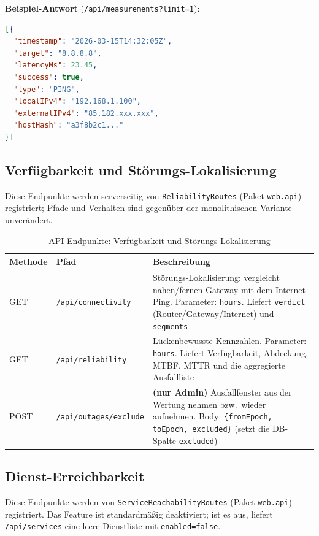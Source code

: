 \textbf{Beispiel-Antwort} (\texttt{/api/measurements?limit=1}):
\begin{lstlisting}[language=json]
[{
  "timestamp": "2026-03-15T14:32:05Z",
  "target": "8.8.8.8",
  "latencyMs": 23.45,
  "success": true,
  "type": "PING",
  "localIPv4": "192.168.1.100",
  "externalIPv4": "85.182.xxx.xxx",
  "hostHash": "a3f8b2c1..."
}]
\end{lstlisting}

\subsection{Verfügbarkeit und Störungs-Lokalisierung}

Diese Endpunkte werden serverseitig von \texttt{ReliabilityRoutes} (Paket \texttt{web.api}) registriert; Pfade und Verhalten sind gegenüber der monolithischen Variante unverändert.

\begin{table}[h]
\centering
\small
\begin{tabular}{|l|l|p{7cm}|}
\hline
\textbf{Methode} & \textbf{Pfad} & \textbf{Beschreibung} \\
\hline
GET & \texttt{/api/connectivity} & Störungs-Lokalisierung: vergleicht nahen/fernen Gateway mit dem Internet-Ping.
  Parameter: \texttt{hours}. Liefert \texttt{verdict} (Router/Gateway/Internet) und \texttt{segments} \\
\hline
GET & \texttt{/api/reliability} & Lückenbewusste Kennzahlen.
  Parameter: \texttt{hours}. Liefert Verfügbarkeit, Abdeckung, MTBF, MTTR und die aggregierte Ausfallliste \\
\hline
POST & \texttt{/api/outages/exclude} & \textbf{(nur Admin)} Ausfallfenster aus der Wertung nehmen bzw.\ wieder aufnehmen.
  Body: \texttt{\{fromEpoch, toEpoch, excluded\}} (setzt die DB-Spalte \texttt{excluded}) \\
\hline
\end{tabular}
\caption{API-Endpunkte: Verfügbarkeit und Störungs-Lokalisierung}
\end{table}

\subsection{Dienst-Erreichbarkeit}

Diese Endpunkte werden von \texttt{ServiceReachabilityRoutes} (Paket \texttt{web.api}) registriert. Das Feature ist standardmäßig deaktiviert; ist es aus, liefert \texttt{/api/services} eine leere Dienstliste mit \texttt{enabled=false}.

